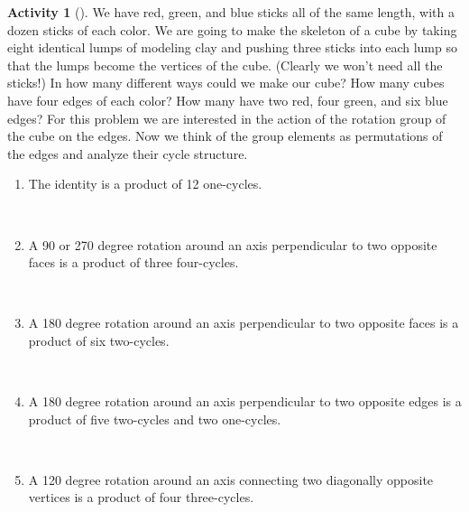 \documentclass[10pt,]{book}
\theoremstyle{plain}
\theoremstyle{definition}
\newtheorem{activity}[project]{Activity}
\numberwithin{equation}{chapter}
\begin{document}
\begin{activity}[]\label{coloredsticks}
We have red, green, and blue sticks all of the same length, with a dozen sticks of each color. We are going to make the skeleton of a cube by taking eight identical lumps of modeling clay and pushing three sticks into each lump so that the lumps become the vertices of the cube. (Clearly we won't need all the sticks!) In how many different ways could we make our cube? How many cubes have four edges of each color? How many have two red, four green, and six blue edges? For this problem we are interested in the action of the rotation group of the cube on the edges. Now we think of the group elements as permutations of the edges and analyze their cycle structure.%
~\par
\begin{enumerate}[label=(\alph*)]
 \item The identity is a product of 12 one-cycles.%

~\par
\item A 90 or 270 degree rotation around an axis perpendicular to two opposite faces is a product of three four-cycles.%

~\par
\item A 180 degree rotation around an axis perpendicular to two opposite faces is a product of six two-cycles.%

~\par
\item A 180 degree rotation around an axis perpendicular to two opposite edges is a product of five two-cycles and two one-cycles.%

~\par
\item A 120 degree rotation around an axis connecting two diagonally opposite vertices is a product of four three-cycles.%


\end{enumerate}
\end{activity}
\end{document}
